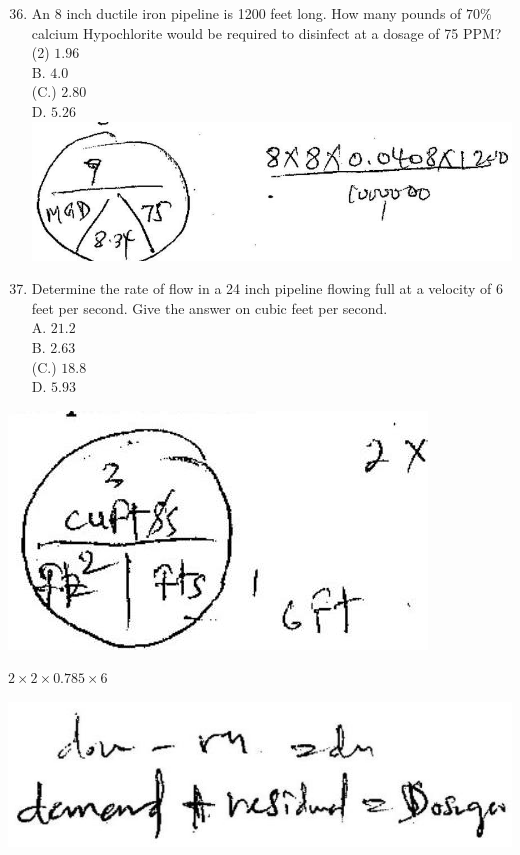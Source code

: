 \documentclass[10pt]{article}
\begin{document}
\begin{enumerate}
  \setcounter{enumi}{35}
  \item An 8 inch ductile iron pipeline is 1200 feet long. How many pounds of $70 \%$ calcium Hypochlorite would be required to disinfect at a dosage of 75 PPM?\\
(2) $1.96$\\
B. $4.0$\\
(C.) $2.80$\\
D. $5.26$\\

\includegraphics[max width=\textwidth]{2022_11_11_a5e8a54031fc138b833ag-5(1)}

  \item Determine the rate of flow in a 24 inch pipeline flowing full at a velocity of 6 feet per second. Give the answer on cubic feet per second.\\
A. $21.2$\\
B. $2.63$\\
(C.) $18.8$\\
D. $5.93$

\end{enumerate}

\includegraphics[max width=\textwidth]{2022_11_11_a5e8a54031fc138b833ag-5(2)}

$2 \times 2 \times 0.785 \times 6$

\includegraphics[max width=\textwidth]{2022_11_11_a5e8a54031fc138b833ag-5(3)}
\end{document}
